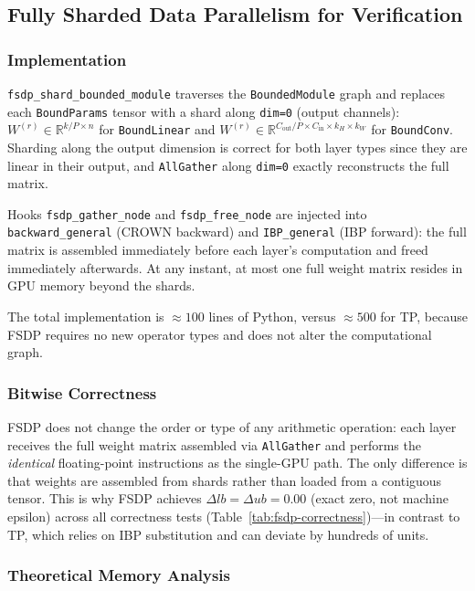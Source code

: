 \documentclass[11pt]{article}
\begin{document}
\subsection{Fully Sharded Data Parallelism for Verification}
\label{sec:fsdp}

\subsubsection{Implementation}

\texttt{fsdp\_shard\_bounded\_module} traverses the \texttt{BoundedModule}
graph and replaces each \texttt{BoundParams} tensor with a shard along
\texttt{dim=0} (output channels):
$W^{(r)} \in \mathbb{R}^{k/P \times n}$ for \texttt{BoundLinear} and
$W^{(r)} \in \mathbb{R}^{C_\text{out}/P \times C_\text{in} \times k_H \times k_W}$
for \texttt{BoundConv}. Sharding along the output dimension is correct for
both layer types since they are linear in their output, and \texttt{AllGather}
along \texttt{dim=0} exactly reconstructs the full matrix.

Hooks \texttt{fsdp\_gather\_node} and \texttt{fsdp\_free\_node} are injected
into \texttt{backward\_general} (CROWN backward) and \texttt{IBP\_general}
(IBP forward): the full matrix is assembled immediately before each layer's
computation and freed immediately afterwards. At any instant, at most one full
weight matrix resides in GPU memory beyond the shards.

The total implementation is ${\approx}100$ lines of Python, versus
${\approx}500$ for TP, because FSDP requires no new operator types and does
not alter the computational graph.

\subsubsection{Bitwise Correctness}

FSDP does not change the order or type of any arithmetic operation: each layer
receives the full weight matrix assembled via \texttt{AllGather} and performs
the \emph{identical} floating-point instructions as the single-GPU path.
The only difference is that weights are assembled from shards rather than
loaded from a contiguous tensor. This is why FSDP achieves
$\Delta lb = \Delta ub = 0.00$ (exact zero, not machine epsilon) across all
correctness tests (Table~\ref{tab:fsdp-correctness})---in contrast to TP,
which relies on IBP substitution and can deviate by hundreds of units.

\subsubsection{Theoretical Memory Analysis}
\label{sec:theory}
\end{document}
